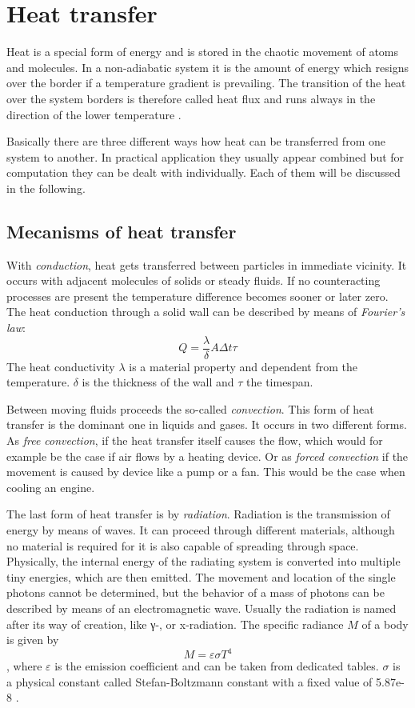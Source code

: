 \section{Heat transfer}
Heat is a special form of energy and is stored in the chaotic movement of atoms and molecules. In a non-adiabatic system it is the amount of energy which resigns over the border if a temperature gradient is prevailing. The transition of the heat over the system borders is therefore called heat flux and runs always in the direction of the lower temperature \cite{cerbe}.

Basically there are three different ways how heat can be transferred from one system to another. In practical application they usually appear combined but for computation they can be dealt with individually. Each of them will be discussed in the following.
\subsection{Mecanisms of heat transfer}
With \emph{conduction}, heat gets transferred between particles in immediate vicinity. It occurs with adjacent molecules of solids or steady fluids. If no counteracting processes are present the temperature difference becomes sooner or later zero. The heat conduction through a solid wall can be described by means of \emph{Fourier's law}:
\begin{equation}
Q = \frac{\lambda}{\delta} A \Delta t \tau
\end{equation}
The heat conductivity $\lambda$ is a material property and dependent from the temperature. $\delta$ is the thickness of the wall and $\tau$ the timespan.

Between moving fluids proceeds the so-called \emph{convection}. This form of heat transfer is the dominant one in liquids and gases. It occurs in two different forms. As \emph{free convection}, if the heat transfer itself causes the flow, which would for example be the case if air flows by a heating device. Or as \emph{forced convection} if the movement is caused by device like a pump or a fan. This would be the case when cooling an engine. 

The last form of heat transfer is by \emph{radiation}. Radiation is the transmission of energy by means of waves. It can proceed through different materials, although no material is required for it is also capable of spreading through space. Physically, the internal energy of the radiating system is converted into multiple tiny energies, which are then emitted. The movement and location of the single photons cannot be determined, but the behavior of a mass of photons can be described by means of an electromagnetic wave. Usually the radiation is named after its way of creation, like γ-, or x-radiation. 
The specific radiance $M$ of a body is given by
\begin{equation}
M = \varepsilon \sigma T^4
\end{equation},
where $\varepsilon$ is the emission coefficient and can be taken from dedicated tables. $\sigma$ is a physical constant called Stefan-Boltzmann constant with a fixed value of 5.87e-8 \cite{cerbe}.
